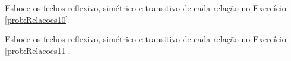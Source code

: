 \begin{questao}\label{prob:Relacoes14}
	Esboce os fechos reflexivo, simétrico e transitivo de cada relação no Exercício \ref{prob:Relacoes10}.
\end{questao}

\begin{questao}\label{prob:Relacoes15}
	Esboce os fechos reflexivo, simétrico e transitivo de cada relação no Exercício \ref{prob:Relacoes11}.
\end{questao}



